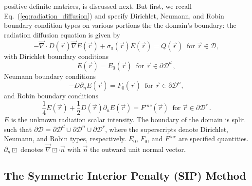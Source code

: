 \documentclass[preprint,10pt]{elsarticle}
\renewcommand{\div}{\vec{\nabla}\! \cdot \!}
\newcommand{\grad}{\vec{\nabla}}
\newcommand{\D}{\mathcal{D}}
\newcommand{\vr}{\vec{r}}
\newcommand{\vn}{\vec{n}}
\newcommand{\eqt}[1]{Eq.~(\ref{#1})}                     %
\begin{document}
positive definite matrices, is discussed next. 
%
But first, we recall \eqt{eq:radiation_diffusion} and specify 
Dirichlet, Neumann, and Robin boundary condition types on various portions the the domain's
boundary: the radiation diffusion equation is given by
\begin{equation}
  -\div D(\vr) \grad E(\vr) + \sigma_a(\vr) E(\vr) = Q(\vr)\ \textrm{ for } \vr \in \D,
\end{equation}
with Dirichlet boundary conditions
\begin{equation}
  E(\vr)  = E_0(\vr)\ \textrm{ for } \vr \in  \partial \D^d \, ,
\end{equation}
Neumann boundary conditions
\begin{equation}
  -D \partial_n E(\vr) = F_0(\vr) \ \textrm{ for } \vr \in \partial \D^n,
\end{equation}
and Robin boundary conditions
\begin{equation}
  \frac{1}{4}E(\vr) + \frac{1}{2} D(\vr) \partial_n E(\vr) = F^{inc}(\vr) \ \textrm{ for } \vr \in  \partial \D^r \, .
\end{equation}
%
$E$ is the unknown radiation scalar intensity. The boundary of the domain is split such that
$\partial \D = \partial \D^d \cup \partial \D^n \cup \partial \D^r$,  where the superscripts
denote Dirichlet, Neumann, and Robin types, respectively. $E_0$, $F_0$, and $F^{inc}$ are specified
quantities. $\partial_n \boxdot$ denotes $ \grad \boxdot \cdot \vn$ with $\vn$ the outward unit normal vector.


\subsection{The Symmetric Interior Penalty (SIP) Method}
\end{document}
